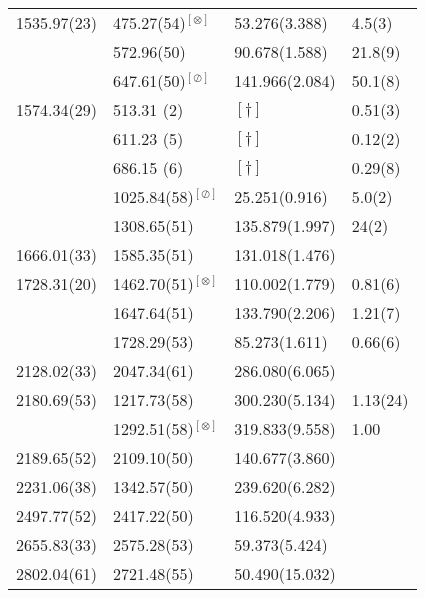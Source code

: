 \begin{longtable}{l|l|l|l}
 1535.97(23) &  475.27(54)$^{[\otimes]}$& 53.276(3.388)  & 4.5(3) \cite{Aprahamian200642}\\ %
             &  572.96(50)               & 90.678(1.588)  & 21.8(9) \cite{Aprahamian200642}\\  %
             &  647.61(50)$^{[\oslash]}$ &141.966(2.084)  & 50.1(8) \cite{Aprahamian200642}\\ \hline %
1574.34(29)  & 513.31 (2)                &  $[\dagger]$   & 0.51(3) \cite{Aprahamian200642}\\
             & 611.23 (5)                &  $[\dagger]$   & 0.12(2) \cite{Aprahamian200642}\\
             & 686.15 (6)                &  $[\dagger]$   & 0.29(8) \cite{Aprahamian200642}\\
             & 1025.84(58)$^{[\oslash]}$ &  25.251(0.916) & 5.0(2) \cite{Aprahamian200642}\\    %
             & 1308.65(51)               & 135.879(1.997) & 24(2)  \cite{Aprahamian200642}\\  \hline %
1666.01(33)  & 1585.35(51)               & 131.018(1.476) & \\  \hline %
1728.31(20)  & 1462.70(51)$^{[\otimes]}$& 110.002(1.779) & 0.81(6) \cite{Govor_162Dy2002} \\   %
             & 1647.64(51)               & 133.790(2.206) & 1.21(7) \cite{Govor_162Dy2002} \\   %
             & 1728.29(53)               &  85.273(1.611) & 0.66(6) \cite{Govor_162Dy2002} \\  \hline %
2128.02(33)  & 2047.34(61)               & 286.080(6.065) & \\ \hline  %
 2180.69(53) &  1217.73(58)              &300.230(5.134)  & 1.13(24) \cite{Wu_2minus_2001}\\  %
             &  1292.51(58)$^{[\otimes]}$&319.833(9.558) & 1.00     \cite{Wu_2minus_2001} \\ \hline %
2189.65(52)  & 2109.10(50)               & 140.677(3.860) & \\ \hline  %
 2231.06(38) & 1342.57(50)               &239.620(6.282)  & \\  \hline%
2497.77(52)  & 2417.22(50)               & 116.520(4.933) & \\ \hline  %
2655.83(33)  & 2575.28(53)               &  59.373(5.424) & \\  \hline %
2802.04(61)  & 2721.48(55)               &  50.490(15.032)& \\ \hline  %




\end{longtable}
